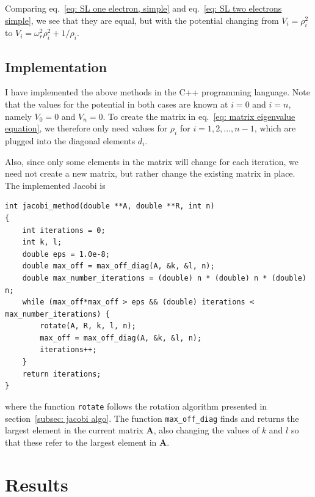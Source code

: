 \documentclass[11pt, a4paper]{article}
\newcommand{\A}{\mathbf{A}}
\begin{document}
			Comparing eq.~\eqref{eq: SL one electron, simple} and eq.~\eqref{eq: SL two electrons simple}, we see that they are equal, but with the potential changing from $V_i = \rho_i^2$ to $V_i = \omega_r^2 \rho_i^2 + 1/\rho_i$.
		
	
	
		\subsection{Implementation}
			I have implemented the above methods in the C++ programming language. Note that the values for the potential in both cases are known at $i=0$ and $i=n$, namely $V_0=0$ and $V_n=0$. To create the matrix in eq.~\eqref{eq: matrix eigenvalue equation}, we therefore only need values for $\rho_i$ for $i=1,2,...,n-1$, which are plugged into the diagonal elements $d_i$. 
			
			Also, since only some elements in the matrix will change for each iteration, we need not create a new matrix, but rather change the existing matrix in place.	The implemented Jacobi is
			\begin{lstlisting}[caption=Jacobi algorithm]
int jacobi_method(double **A, double **R, int n)
{
    int iterations = 0;
    int k, l;
    double eps = 1.0e-8;
    double max_off = max_off_diag(A, &k, &l, n);
    double max_number_iterations = (double) n * (double) n * (double) n;
    while (max_off*max_off > eps && (double) iterations < max_number_iterations) {
        rotate(A, R, k, l, n);
        max_off = max_off_diag(A, &k, &l, n);
        iterations++;
    }
    return iterations;
}
			\end{lstlisting}
		
			where the function \texttt{rotate} follows the rotation algorithm presented in section~\ref{subsec: jacobi algo}. The function \texttt{max\_off\_diag} finds and returns the largest element in the current matrix $\A$, also changing the values of $k$ and $l$ so that these refer to the largest element in $\A$.

	\section{Results}
\end{document}
